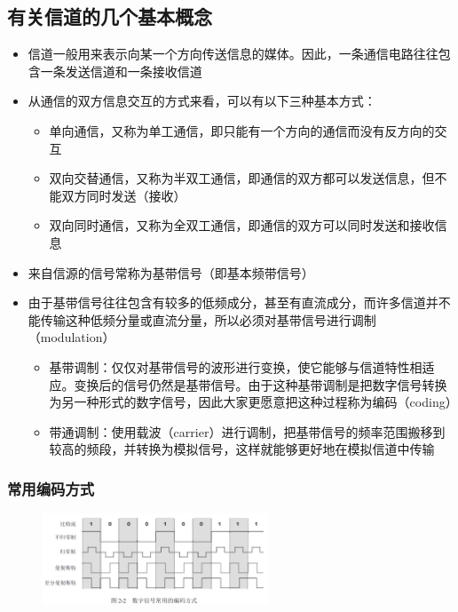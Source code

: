\documentclass[cs4size,a4paper,10pt]{ctexart}
\begin{document}
	\subsection{有关信道的几个基本概念}
	\begin{itemize}
		\item 信道一般用来表示向某一个方向传送信息的媒体。因此，一条通信电路往往包含一条发送信道和一条接收信道
		\item 从通信的双方信息交互的方式来看，可以有以下三种基本方式：
		\begin{itemize}
			\item 单向通信，又称为单工通信，即只能有一个方向的通信而没有反方向的交互
			\item 双向交替通信，又称为半双工通信，即通信的双方都可以发送信息，但不能双方同时发送（接收）
			\item 双向同时通信，又称为全双工通信，即通信的双方可以同时发送和接收信息
		\end{itemize}
		\item 来自信源的信号常称为基带信号（即基本频带信号）
		\item 由于基带信号往往包含有较多的低频成分，甚至有直流成分，而许多信道并不能传输这种低频分量或直流分量，所以必须对基带信号进行调制（modulation）
		\begin{itemize}
			\item 基带调制：仅仅对基带信号的波形进行变换，使它能够与信道特性相适应。变换后的信号仍然是基带信号。由于这种基带调制是把数字信号转换为另一种形式的数字信号，因此大家更愿意把这种过程称为编码（coding）
			\item 带通调制：使用载波（carrier）进行调制，把基带信号的频率范围搬移到较高的频段，并转换为模拟信号，这样就能够更好地在模拟信道中传输
		\end{itemize}
	\end{itemize}

	\subsubsection{常用编码方式}

	\begin{figure}[H]
		\centering
		\includegraphics[width=0.6\textwidth]{img/2.2}
	\end{figure}
\end{document}
